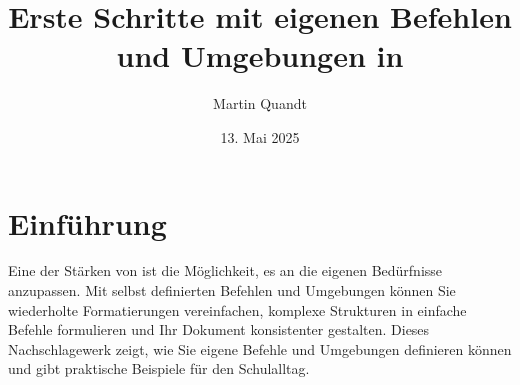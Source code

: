 



\newcommand{\schulname}{Gymnasium Musterhausen}
\newcommand{\betrag}[1]{|#1|}
\newcommand{\bruch}[2]{\frac{#1}{#2}}
\newcommand{\gruss}[1][Viele Gruesse]{\textbf{#1,}\\ Martin Quandt}



\newenvironment{wichtig}
  {\begin{center}\itshape\bfseries}  %
  {\end{center}}                     %

\newenvironment{notiz}[1]
  {\noindent\textbf{#1:}\itshape\indent}
  {\par}





\title{Erste Schritte mit eigenen Befehlen und Umgebungen in }
\author{Martin Quandt}
\date{13. Mai 2025}
\pagestyle{plain}


\maketitle


\section{Einführung}

Eine der Stärken von  ist die Möglichkeit, es an die eigenen Bedürfnisse anzupassen. Mit selbst definierten Befehlen und Umgebungen können Sie wiederholte Formatierungen vereinfachen, komplexe Strukturen in einfache Befehle formulieren und Ihr Dokument konsistenter gestalten. Dieses Nachschlagewerk zeigt, wie Sie eigene Befehle und Umgebungen definieren können und gibt praktische Beispiele für den Schulalltag.



